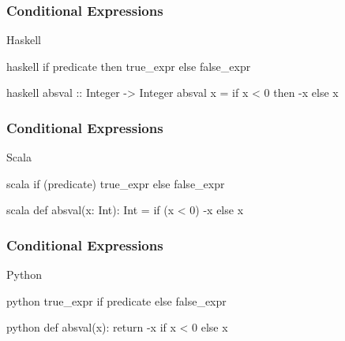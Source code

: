 \documentclass[dvipsnames]{beamer}
\theoremstyle{plain}
\begin{document}
\begin{frame}[fragile]
  \frametitle{Conditional Expressions}

  \begin{block}{Haskell}
    \begin{pygments}{haskell}
if predicate then true_expr else false_expr
    \end{pygments}
  \end{block}

  \medskip
  \begin{example}
    \begin{pygments}{haskell}
absval :: Integer -> Integer
absval x = if x < 0 then -x else x
    \end{pygments}
  \end{example}
\end{frame}

\begin{frame}[fragile]
  \frametitle{Conditional Expressions}

  \begin{block}{Scala}
    \begin{pygments}{scala}
if (predicate) true_expr else false_expr
    \end{pygments}
  \end{block}

  \medskip
  \begin{example}
    \begin{pygments}{scala}
def absval(x: Int): Int =
    if (x < 0) -x else x
    \end{pygments}
  \end{example}
\end{frame}

\begin{frame}[fragile]
  \frametitle{Conditional Expressions}

  \begin{block}{Python}
    \begin{pygments}{python}
true_expr if predicate else false_expr
    \end{pygments}
  \end{block}

  \medskip
  \begin{example}
    \begin{pygments}{python}
def absval(x):
    return -x if x < 0 else x
    \end{pygments}
  \end{example}
\end{frame}
\end{document}

